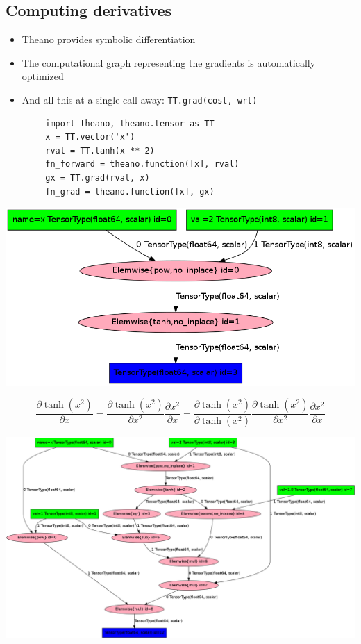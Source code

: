 \documentclass[9pt]{beamer}
\begin{document}
\subsection{Computing derivatives}
\begin{frame}[fragile]
    \begin{itemize}
    \item Theano provides symbolic differentiation 
    \item The computational graph representing the gradients is
    automatically optimized
    \item And all this at a single call away: \texttt{TT.grad(cost, wrt)}
    \end{itemize}

    \begin{verbatim}
        import theano, theano.tensor as TT
        x = TT.vector('x')
        rval = TT.tanh(x ** 2)
        fn_forward = theano.function([x], rval)
        gx = TT.grad(rval, x)
        fn_grad = theano.function([x], gx)
    \end{verbatim}
\end{frame}
\begin{frame}
    \includegraphics[width=.8\textwidth]{pics/compgraph2.png}
    
    \begin{equation}
        \frac{\partial \tanh(x^2)}{\partial x} = \frac{\partial \tanh(x^2)}{\partial x^2} \frac{\partial x^2}{\partial x} =  
         \frac{\partial \tanh(x^2)}{\partial \tanh(x^2)}\frac{\partial \tanh(x^2)}{\partial x^2} \frac{\partial x^2}{\partial x} 
    \end{equation}

\end{frame}
\begin{frame}
    \includegraphics[width=1\textwidth]{pics/compgraph3.png} 

\end{frame}
\end{document}
